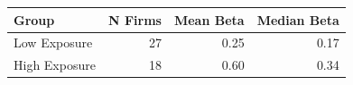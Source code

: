 \begin{tabular}{lrrr}
  \toprule
Group & N Firms & Mean Beta & Median Beta \\
  \midrule
Low Exposure &  27 & 0.25 & 0.17 \\
  High Exposure &  18 & 0.60 & 0.34 \\
   \bottomrule
\end{tabular}
